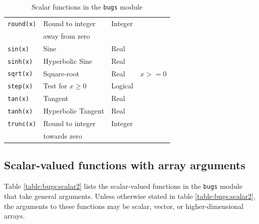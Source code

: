 \documentclass[11pt, a4paper, titlepage]{report}
\begin{document}
\begin{table}
\begin{center}
\begin{tabular}{llll}
\verb+round(x)+     & Round to integer    & Integer & \\
                    & away from zero      &      & \\
\verb+sin(x)+       & Sine                & Real & \\
\verb+sinh(x)+      & Hyperbolic Sine     & Real & \\
\verb+sqrt(x)+      & Square-root         & Real & $x >= 0$ \\
\verb+step(x)+      & Test for $x \geq 0$ & Logical & \\
\verb+tan(x)+       & Tangent             & Real & \\
\verb+tanh(x)+      & Hyperbolic Tangent  & Real & \\
\verb+trunc(x)+     & Round to integer    & Integer & \\
                    & towards zero        & \\
\hline
\end{tabular}
\caption{Scalar functions in the \texttt{bugs} module \label{table:bugs:scalar}}
\end{center}
\end{table}



\subsection{Scalar-valued functions with array arguments}

Table \ref{table:bugs:scalar2} lists the scalar-valued functions in the
\texttt{bugs} module that take general arguments. Unless otherwise
stated in table \ref{table:bugs:scalar2}, the arguments to these functions
may be scalar, vector, or higher-dimensional arrays.
\end{document}
